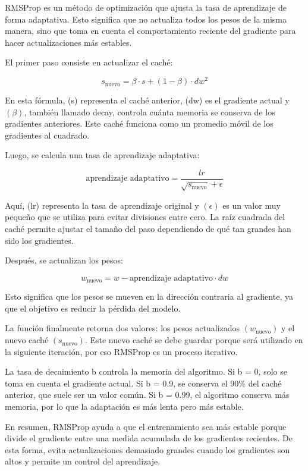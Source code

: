 \documentclass[12pt]{article}
\begin{document}
RMSProp es un método de optimización que ajusta la tasa de aprendizaje de forma adaptativa. Esto significa que no 
actualiza todos los pesos de la misma manera, sino que toma en cuenta el comportamiento reciente del gradiente para 
hacer actualizaciones más estables.

El primer paso consiste en actualizar el caché:

$$
s_{\text{nuevo}} = \beta \cdot s + (1 - \beta) \cdot dw^2
$$

En esta fórmula, (s) representa el caché anterior, (dw) es el gradiente actual y $(\beta)$, también llamado decay, 
controla cuánta memoria se conserva de los gradientes anteriores. Este caché funciona como un promedio móvil de los 
gradientes al cuadrado.

Luego, se calcula una tasa de aprendizaje adaptativa:

$$
\text{aprendizaje adaptativo} =
\frac{lr}{\sqrt{s_{\text{nuevo}}} + \epsilon}
$$

Aquí, (lr) representa la tasa de aprendizaje original y $(\epsilon)$ es un valor muy pequeño que se utiliza para 
evitar divisiones entre cero. La raíz cuadrada del caché permite ajustar el tamaño del paso dependiendo de qué tan 
grandes han sido los gradientes.

Después, se actualizan los pesos:

$$
w_{\text{nuevo}} = w - \text{aprendizaje adaptativo} \cdot dw
$$

Esto significa que los pesos se mueven en la dirección contraria al gradiente, ya que el objetivo es reducir la pérdida 
del modelo.

La función finalmente retorna dos valores: los pesos actualizados $(w_{\text{nuevo}})$ y el nuevo caché $(s_{\text{nuevo}})$. 
Este nuevo caché se debe guardar porque será utilizado en la siguiente iteración, por eso RMSProp es un proceso iterativo.

La tasa de decaimiento b controla la memoria del algoritmo. Si b = 0, solo se toma en cuenta el gradiente actual. Si b = 0.9, 
se conserva el 90\% del caché anterior, que suele ser un valor común. Si b = 0.99, el algoritmo conserva más memoria, por lo 
que la adaptación es más lenta pero más estable.

En resumen, RMSProp ayuda a que el entrenamiento sea más estable porque divide el gradiente entre una medida acumulada de los 
gradientes recientes. De esta forma, evita actualizaciones demasiado grandes cuando los gradientes son altos y permite un 
control del aprendizaje.
\end{document}
